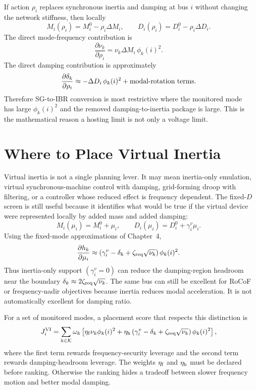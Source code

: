 \begin{remark}
If action \(\rho_i\) replaces synchronous inertia and damping at bus \(i\)
without changing the network stiffness, then locally
\[
  M_i(\rho_i)=M_i^0-\rho_i\Delta M_i,\qquad
  D_i(\rho_i)=D_i^0-\rho_i\Delta D_i.
\]
The direct mode-frequency contribution is
\[
  \frac{\partial\nu_k}{\partial\rho_i}
  =
  \nu_k\Delta M_i\,\phi_k(i)^2.
\]
The direct damping contribution is approximately
\[
  \frac{\partial\delta_k}{\partial\rho_i}
  \approx
  -\Delta D_i\,\phi_k(i)^2
  +
  \hbox{modal-rotation terms}.
\]
Therefore SG-to-IBR conversion is most restrictive where the monitored mode
has large \(\phi_k(i)^2\) and the removed damping-to-inertia package is large.
This is the mathematical reason a hosting limit is not only a voltage limit.
\end{remark}

\section{Where to Place Virtual Inertia}

Virtual inertia is not a single planning lever. It may mean inertia-only
emulation, virtual synchronous-machine control with damping, grid-forming
droop with filtering, or a controller whose reduced effect is frequency
dependent. The fixed-\(D\) screen is still useful because it identifies what
would be true if the virtual device were represented locally by added mass and
added damping:
\begin{equation}
  M_i(\mu_i)=M_i^0+\mu_i,\qquad
  D_i(\mu_i)=D_i^0+\gamma_i^v\mu_i.
  \label{eq:virtual_inertia_local_model}
\end{equation}
Using the fixed-mode approximations of Chapter~4,
\begin{equation}
  \frac{\partial h_k}{\partial \mu_i}
  \approx
  \left(\gamma_i^v-\delta_k+\zeta_{\rm req}\sqrt{\nu_k}\right)\phi_k(i)^2.
  \label{eq:virtual_inertia_hosting_gradient}
\end{equation}
Thus inertia-only support \((\gamma_i^v=0)\) can reduce the damping-region
headroom near the boundary \( \delta_k\approx2\zeta_{\rm req}\sqrt{\nu_k}\). The same
bus can still be excellent for RoCoF or frequency-nadir objectives because
inertia reduces modal acceleration. It is not automatically excellent for
damping ratio.

For a set of monitored modes, a placement score that respects this distinction
is
\begin{equation}
  J_i^{\rm VI}
  =
  \sum_{k\in\mathcal K}\omega_k
  \left[
  \eta_{\rm f}\nu_k\phi_k(i)^2
  +
  \eta_{\rm h}
  \left(\gamma_i^v-\delta_k+\zeta_{\rm req}\sqrt{\nu_k}\right)\phi_k(i)^2
  \right],
  \label{eq:virtual_inertia_score}
\end{equation}
where the first term rewards frequency-security leverage and the second term
rewards damping-headroom leverage. The weights \(\eta_{\rm f}\) and
\(\eta_{\rm h}\) must be declared before ranking. Otherwise the ranking hides
a tradeoff between slower frequency motion and better modal damping.

